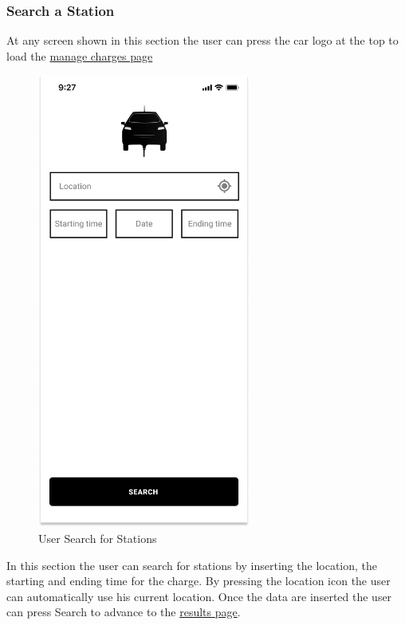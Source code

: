 \subsubsection{Search a Station}
At any screen shown in this section the user can press the car logo at the top to load the \hyperref[fig:myCharges]{manage charges page}
\begin{figure}[H]
    \centering
    \includegraphics[keepaspectratio, height=15cm]{AppInterface/Station Search.png}
    \caption{User Search for Stations}
    \label{fig:Search}
\end{figure}
In this section the user can search for stations by inserting the location, the starting and ending time for the charge. By pressing the location icon the user can automatically use his current location.
Once the data are inserted the user can press Search to advance to the \hyperref[fig:Results]{results page}.
